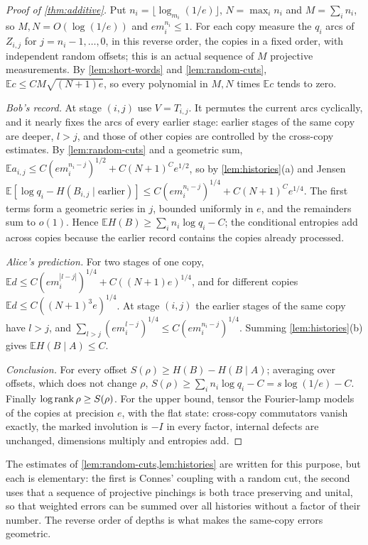 \begin{proof}[Proof of \cref{thm:additive}]
Put $n_i=\lfloor\log_{m_i}(1/e)\rfloor$, $N=\max_in_i$ and $M=\sum_in_i$, so $M,N=O(\log(1/e))$ and $em_i^{n_i}\le1$. For each copy
measure the $q_i$ arcs of $Z_{i,j}$ for $j=n_i-1,\dots,0$, in this reverse order, the copies in a fixed order, with
independent random offsets; this is an actual sequence of $M$ projective measurements. By \cref{lem:short-words} and
\cref{lem:random-cuts}, $\mathbb Ec\le CM\sqrt{(N+1)e}$, so every polynomial in $M,N$ times $\mathbb Ec$ tends to zero.

\emph{Bob's record.} At stage $(i,j)$ use $V=T_{i,j}$. It permutes the current arcs cyclically, and it nearly fixes the arcs of
every earlier stage: earlier stages of the same copy are deeper, $l>j$, and those of other copies are controlled by the
cross-copy estimates. By \cref{lem:random-cuts} and a geometric sum,
$\mathbb Ea_{i,j}\le C(em_i^{n_i-j})^{1/2}+C(N+1)^Ce^{1/2}$, so by \cref{lem:histories}(a) and Jensen
$\mathbb E[\log q_i-H(B_{i,j}\mid\text{earlier})]\le C(em_i^{n_i-j})^{1/4}+C(N+1)^Ce^{1/4}$. The first terms form a geometric series
in $j$, bounded uniformly in $e$, and the remainders sum to $o(1)$. Hence $\mathbb EH(B)\ge\sum_in_i\log q_i-C$; the conditional
entropies add across copies because the earlier record contains the copies already processed.

\emph{Alice's prediction.} For two stages of one copy, $\mathbb Ed\le C(em_i^{|l-j|})^{1/4}+C((N+1)e)^{1/4}$, and for different copies
$\mathbb Ed\le C((N+1)^3e)^{1/4}$. At stage $(i,j)$ the earlier stages of the same copy have $l>j$, and
$\sum_{l>j}(em_i^{l-j})^{1/4}\le C(em_i^{n_i-j})^{1/4}$. Summing \cref{lem:histories}(b) gives $\mathbb EH(B\mid A)\le C$.

\emph{Conclusion.} For every offset $S(\rho)\ge H(B)-H(B\mid A)$; averaging over offsets, which does not change $\rho$,
$S(\rho)\ge\sum_in_i\log q_i-C=s\log(1/e)-C$. Finally $\log\operatorname{rank}\rho\ge S(\rho)$. For the upper bound, tensor the Fourier-lamp
models of the copies at precision $e$, with the flat state: cross-copy commutators vanish exactly, the marked involution is
$-I$ in every factor, internal defects are unchanged, dimensions multiply and entropies add.
\end{proof}

The estimates of \cref{lem:random-cuts,lem:histories} are written for this purpose, but each is elementary: the first is
Connes' coupling with a random cut, the second uses that a sequence of projective pinchings is both trace preserving and
unital, so that weighted errors can be summed over all histories without a factor of their number. The reverse order of
depths is what makes the same-copy errors geometric.

